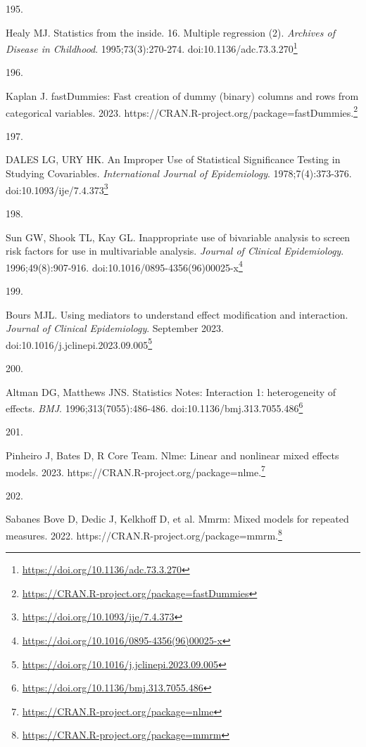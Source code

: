 \documentclass[
  a4paper,
]{book}
\newlength{\cslhangindent}
\newlength{\csllabelwidth}
\newlength{\cslentryspacingunit} %
\newenvironment{CSLReferences}[2] %
 {%
  \setlength{\parindent}{0pt}
  \ifodd #1
  \let\oldpar\par
  \def\par{\hangindent=\cslhangindent\oldpar}
  \fi
  \setlength{\parskip}{#2\cslentryspacingunit}
 }%
 {}
\newcommand{\CSLLeftMargin}[1]{\parbox[t]{\csllabelwidth}{#1}}
\newcommand{\CSLRightInline}[1]{\parbox[t]{\linewidth - \csllabelwidth}{#1}\break}
\renewcommand{\href}[2]{#2\footnote{\url{#1}}}
\begin{document}
\begin{CSLReferences}{0}{0}
\leavevmode{}%
\CSLLeftMargin{195. }%
\CSLRightInline{Healy MJ. Statistics from the inside. 16. Multiple regression (2). \emph{Archives of Disease in Childhood}. 1995;73(3):270-274. doi:\href{https://doi.org/10.1136/adc.73.3.270}{10.1136/adc.73.3.270}}

\leavevmode{}%
\CSLLeftMargin{196. }%
\CSLRightInline{Kaplan J. fastDummies: Fast creation of dummy (binary) columns and rows from categorical variables. 2023. \href{https://CRAN.R-project.org/package=fastDummies}{https://CRAN.R-project.org/package=fastDummies.}}

\leavevmode{}%
\CSLLeftMargin{197. }%
\CSLRightInline{DALES LG, URY HK. An Improper Use of Statistical Significance Testing in Studying Covariables. \emph{International Journal of Epidemiology}. 1978;7(4):373-376. doi:\href{https://doi.org/10.1093/ije/7.4.373}{10.1093/ije/7.4.373}}

\leavevmode{}%
\CSLLeftMargin{198. }%
\CSLRightInline{Sun GW, Shook TL, Kay GL. Inappropriate use of bivariable analysis to screen risk factors for use in multivariable analysis. \emph{Journal of Clinical Epidemiology}. 1996;49(8):907-916. doi:\href{https://doi.org/10.1016/0895-4356(96)00025-x}{10.1016/0895-4356(96)00025-x}}

\leavevmode{}%
\CSLLeftMargin{199. }%
\CSLRightInline{Bours MJL. Using mediators to understand effect modification and interaction. \emph{Journal of Clinical Epidemiology}. September 2023. doi:\href{https://doi.org/10.1016/j.jclinepi.2023.09.005}{10.1016/j.jclinepi.2023.09.005}}

\leavevmode{}%
\CSLLeftMargin{200. }%
\CSLRightInline{Altman DG, Matthews JNS. Statistics Notes: Interaction 1: heterogeneity of effects. \emph{BMJ}. 1996;313(7055):486-486. doi:\href{https://doi.org/10.1136/bmj.313.7055.486}{10.1136/bmj.313.7055.486}}

\leavevmode{}%
\CSLLeftMargin{201. }%
\CSLRightInline{Pinheiro J, Bates D, R Core Team. Nlme: Linear and nonlinear mixed effects models. 2023. \href{https://CRAN.R-project.org/package=nlme}{https://CRAN.R-project.org/package=nlme.}}

\leavevmode{}%
\CSLLeftMargin{202. }%
\CSLRightInline{Sabanes Bove D, Dedic J, Kelkhoff D, et al. Mmrm: Mixed models for repeated measures. 2022. \href{https://CRAN.R-project.org/package=mmrm}{https://CRAN.R-project.org/package=mmrm.}}


\end{CSLReferences}
\end{document}
